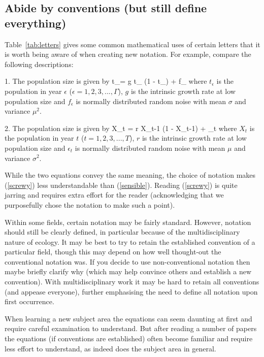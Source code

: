\subsection*{Abide by conventions (but still define everything)}

Table~\ref{tab:letters} gives some common mathematical uses of certain letters
that it is worth being aware of when creating new notation.
For example, compare the following descriptions:

1. The population size is given by
\eb
t_\epsilon = g t_{} (1 - t_{}) + f_\epsilon
\label{screwy}
\ee
where $t_\epsilon$ is the population in year
$\epsilon$ ($\epsilon = 1, 2, 3, ..., \Gamma$), $g$ is the
intrinsic growth rate at low population size
and $f_\epsilon$ is normally distributed random noise with mean $\sigma$ and
variance $\mu^2$.

2. The population size is given by
\eb
X_t = r X_{t-1} (1 - X_{t-1}) + \epsilon_t
\label{sensible}
\ee
where $X_t$ is the population in year $t$ ($t = 1, 2, 3, ..., T$), $r$ is the
intrinsic growth rate at low population size
and $\epsilon_t$ is normally distributed random noise with mean $\mu$ and
variance $\sigma^2$.

While the two equations convey the same meaning, the choice of notation
makes (\ref{screwy}) less understandable than (\ref{sensible}).
Reading (\ref{screwy}) is quite jarring and requires extra effort for
the reader (acknowledging that we purposefully chose the notation
to make such a point).

Within some fields, certain notation may be fairly standard. However,
notation should still be clearly defined, in particular because
of the multidisciplinary nature of ecology.
It may be best to try to retain the established convention of a
particular field, though this may depend on how well thought-out the
conventional notation was. If you decide to use non-conventional notation
then maybe briefly clarify why (which may help convince others and establish
a new convention). With multidisciplinary work it may be hard to retain all
conventions (and appease everyone), further emphasising the need to define
all notation upon first occurrence.

When learning a new subject area the equations can seem
daunting at first and require careful examination to understand.
But after reading a number of papers the equations (if
conventions are established) often become familiar and require less effort to
understand, as indeed does the subject area in general.

